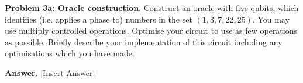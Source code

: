 \textbf{Problem 3a: Oracle construction}. Construct an oracle with five qubits, which identifies (i.e. applies a phase to) numbers in the set $(1, 3, 7, 22, 25)$. 
You may use multiply controlled operations.
Optimise your circuit to use as few operations as possible. 
Briefly describe your implementation of this circuit including any optimisations which you have made.


\textbf{Answer}. [Insert Answer]


